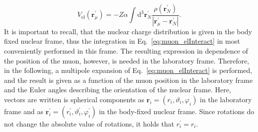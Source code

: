 \begin{equation}
\label{eq:muon_elInteract}
V_{\text{el}}(\mathbf{r}_\mu^\prime)=-Z\alpha \int \mathrm{d}^3\mathbf{r}_N^\prime \frac{\rho(\mathbf{r}_N^\prime)}{|\mathbf{r}_\mu^\prime-\mathbf{r}_N^\prime|}.
\end{equation}
It is important to recall, that the nuclear charge distribution is given in the body fixed nuclear frame, thus the integration in Eq.~\eqref{eq:muon_elInteract} in most conveniently performed in this frame. The resulting expression in dependence of the position of the muon, however, is needed in the laboratory frame. Therefore, in the following, a multipole expansion of Eq.~\eqref{eq:muon_elInteract} is performed, and the result is given as a function of the muon position in the laboratory frame and the Euler angles describing the orientation of the nuclear frame. Here, vectors are written is spherical components as $\mathbf{r}_i = (r_i,\vartheta_i,\varphi_i)$ in the laboratory frame and as $\mathbf{r}_i^\prime = (r_i^\prime,\vartheta_i^\prime,\varphi_i^\prime)$ in the body-fixed nuclear frame. Since rotations do not change the absolute value of rotations, it holds that $r_i^\prime = r_i$.\\

